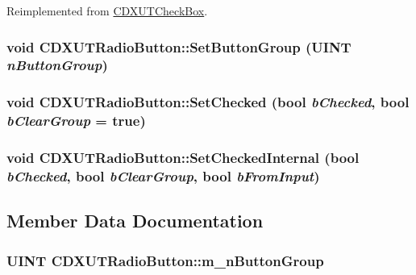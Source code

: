 Reimplemented from \hyperlink{class_c_d_x_u_t_check_box_a5d9a74ce30be05f4867945c80f298a0a}{CDXUTCheckBox}.\hypertarget{class_c_d_x_u_t_radio_button_ae9aeefdd748214afa0568bdb5ebadfbc}{
\subsubsection[{SetButtonGroup}]{\setlength{\rightskip}{0pt plus 5cm}void CDXUTRadioButton::SetButtonGroup (UINT {\em nButtonGroup})}}
\label{class_c_d_x_u_t_radio_button_ae9aeefdd748214afa0568bdb5ebadfbc}
\hypertarget{class_c_d_x_u_t_radio_button_a697cac8fe1c233671808252e9407f0ac}{
\subsubsection[{SetChecked}]{\setlength{\rightskip}{0pt plus 5cm}void CDXUTRadioButton::SetChecked (bool {\em bChecked}, \/  bool {\em bClearGroup} = {\ttfamily true})}}
\label{class_c_d_x_u_t_radio_button_a697cac8fe1c233671808252e9407f0ac}
\hypertarget{class_c_d_x_u_t_radio_button_acf255e4bd5ace345d6cacd01621a7000}{
\subsubsection[{SetCheckedInternal}]{\setlength{\rightskip}{0pt plus 5cm}void CDXUTRadioButton::SetCheckedInternal (bool {\em bChecked}, \/  bool {\em bClearGroup}, \/  bool {\em bFromInput})}}
\label{class_c_d_x_u_t_radio_button_acf255e4bd5ace345d6cacd01621a7000}


\subsection{Member Data Documentation}
\hypertarget{class_c_d_x_u_t_radio_button_a7d7389318e71e397b93666e7f0ca8664}{
\subsubsection[{m\_\-nButtonGroup}]{\setlength{\rightskip}{0pt plus 5cm}UINT {\bf CDXUTRadioButton::m\_\-nButtonGroup}}}
\label{class_c_d_x_u_t_radio_button_a7d7389318e71e397b93666e7f0ca8664}


